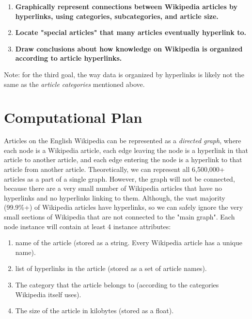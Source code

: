\documentclass[fontsize=11pt]{article}
\begin{document}
\begin{enumerate}

\item{\textbf{Graphically represent connections between Wikipedia articles by hyperlinks, using categories, subcategories, and article size.}}

\item{\textbf{Locate "special articles" that many articles eventually hyperlink to.}}

\item{\textbf{Draw conclusions about how knowledge on Wikipedia is organized according to article hyperlinks.}}

\end{enumerate}

Note: for the third goal, the way data is organized by hyperlinks is likely not the same as the \textit{article categories} mentioned above.  



\section*{Computational Plan}

Articles on the English Wikipedia can be represented as a \textit{directed graph}, where each node is a Wikipedia article, each edge leaving the node is a hyperlink in that article to another article, and each edge entering the node is a hyperlink to that article from another article. Theoretically, we can represent all 6,500,000+ articles as a part of a single graph. However, the graph will not be connected, because there are a very small number of Wikipedia articles that have no hyperlinks and no hyperlinks linking to them. Although, the vast majority (99.9\%+) of Wikipedia articles have hyperlinks, so we can safely ignore the very small sections of Wikipedia that are not connected to the "main graph". Each node instance will contain at least 4 instance attributes:

\begin{enumerate}
\item{name of the article (stored as a string. Every Wikipedia article has a unique name).}
\item{list of hyperlinks in the article (stored as a set of article names).}
\item{The category that the article belongs to (according to the categories Wikipedia itself uses).}
\item{The size of the article in kilobytes (stored as a float).}
\end{enumerate} 
\end{document}
